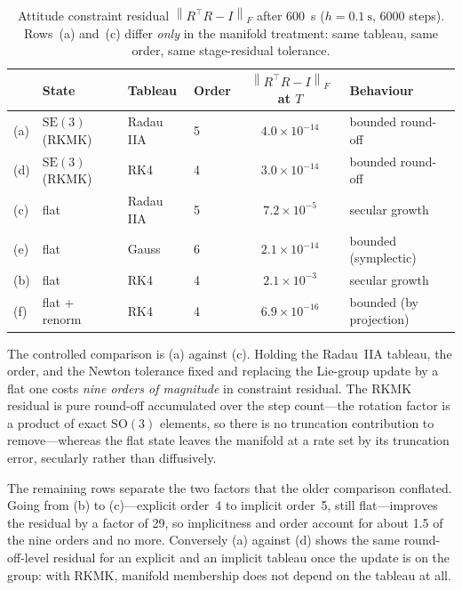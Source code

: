 \documentclass[a4paper,10pt]{article}
\newcommand{\SO}{\mathrm{SO}(3)}
\newcommand{\SE}{\mathrm{SE}(3)}
\newcommand{\norm}[1]{\left\lVert #1 \right\rVert}
\theoremstyle{definition}
\begin{document}
\begin{table}[h]
  \centering
  \caption{Attitude constraint residual $\norm{R^\top R - I}_F$ after
    \SI{600}{\second} ($h = \SI{0.1}{\second}$, \num{6000} steps).  Rows~(a)
    and~(c) differ \emph{only} in the manifold treatment: same tableau, same
    order, same stage-residual tolerance.}
  \label{tab:drift}
  \small
  \begin{tabular}{llllcl}
    \toprule
    & State & Tableau & Order & $\norm{R^\top R - I}_F$ at $T$ & Behaviour \\
    \midrule
    (a) & $\SE$ (RKMK)  & Radau IIA & 5 & $4.0\times10^{-14}$ & bounded round-off \\
    (d) & $\SE$ (RKMK)  & RK4       & 4 & $3.0\times10^{-14}$ & bounded round-off \\
    (c) & flat          & Radau IIA & 5 & $7.2\times10^{-5}$  & secular growth \\
    (e) & flat          & Gauss     & 6 & $2.1\times10^{-14}$ & bounded (symplectic) \\
    (b) & flat          & RK4       & 4 & $2.1\times10^{-3}$  & secular growth \\
    (f) & flat + renorm & RK4       & 4 & $6.9\times10^{-16}$ & bounded (by projection) \\
    \bottomrule
  \end{tabular}
\end{table}

The controlled comparison is (a) against (c).  Holding the Radau~IIA tableau,
the order, and the Newton tolerance fixed and replacing the Lie-group update by
a flat one costs \emph{nine orders of magnitude} in constraint residual.  The
RKMK residual is pure round-off accumulated over the step count---the rotation
factor is a product of exact $\SO$ elements, so there is no truncation
contribution to remove---whereas the flat state leaves the manifold at a rate
set by its truncation error, secularly rather than diffusively.

The remaining rows separate the two factors that the older comparison
conflated.  Going from (b) to (c)---explicit order~4 to implicit order~5, still
flat---improves the residual by a factor of \num{29}, so implicitness and order
account for about \num{1.5} of the nine orders and no more.  Conversely (a)
against (d) shows the same round-off-level residual for an explicit and an
implicit tableau once the update is on the group: with RKMK, manifold
membership does not depend on the tableau at all.
\end{document}
